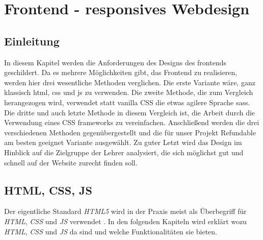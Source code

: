 
\section{Frontend - responsives Webdesign}
	\subsection{Einleitung}
	In diesem Kapitel werden die Anforderungen des Designs des \Gls{frontend}s geschildert. Da es mehrere Möglichkeiten gibt, das Frontend zu realisieren, werden hier drei wesentliche Methoden verglichen. Die erste Variante wäre, ganz klassisch \Gls{html}, \Gls{css} und \Gls{js} zu verwenden. Die zweite Methode, die zum Vergleich herangezogen wird, verwendet statt \Gls{vanilla} CSS die etwas agilere Sprache \Gls{sass}. Die dritte und auch letzte Methode in diesem Vergleich ist, die Arbeit durch die Verwendung eines CSS \Gls{framework}s zu vereinfachen. Anschließend werden die drei verschiedenen Methoden gegenübergestellt und die für unser Projekt Refundable am besten geeignet Variante ausgewählt. Zu guter Letzt wird das Design im Hinblick auf die Zielgruppe der Lehrer analysiert, die sich möglichst gut und schnell auf der Website zurecht finden soll.
	
	\subsection{HTML, CSS, JS}
	Der eigentliche Standard \textit{HTML5} wird in der Praxis meist als Überbegriff für \textit{HTML}, \textit{CSS} und \textit{JS} verwendet \cite{html5-css3-handbuch}. In den folgenden Kapiteln wird erklärt wozu \textit{HTML}, \textit{CSS} und \textit{JS} da sind und welche Funktionalitäten sie bieten.
	
